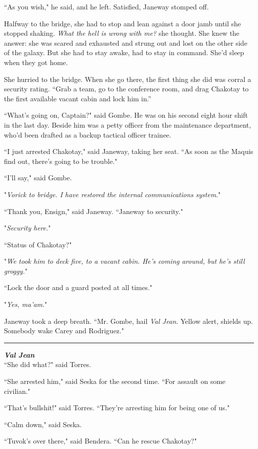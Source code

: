 \documentclass[twoside,letterpaper,12pt]{memoir}
\begin{document}
``As you wish," he said, and he left. Satisfied, Janeway stomped off.

Halfway to the bridge, she had to stop and lean against a door jamb until she stopped shaking. \textit{What the hell is wrong with me?} she thought. She knew the answer: she was scared and exhausted and strung out and lost on the other side of the galaxy. But she had to stay awake, had to stay in command. She'd sleep when they got home.

She hurried to the bridge. When she go there, the first thing she did was corral a security rating. ``Grab a team, go to the conference room, and drag Chakotay to the first available vacant cabin and lock him in.''

``What's going on, Captain?" said Gombe. He was on his second eight hour shift in the last day. Beside him was a petty officer from the maintenance department, who'd been drafted as a backup tactical officer trainee.

``I just arrested Chakotay," said Janeway, taking her seat. ``As soon as the Maquis find out, there's going to be trouble."

``I'll say," said Gombe.

"\textit{Vorick to bridge. I have restored the internal communications system}."

``Thank you, Ensign," said Janeway. ``Janeway to security."

"\textit{Security here.}"

``Status of Chakotay?"

"\textit{We took him to deck five, to a vacant cabin. He’s coming around, but he’s still groggy.}"

``Lock the door and a guard posted at all times."

"\textit{Yes, ma'am.}"

Janeway took a deep breath. ``Mr. Gombe, hail \textit{Val Jean}. Yellow alert, shields up. Somebody wake Carey and Rodriguez."

\fancybreak{\rule{3cm}{0.4 pt}}
\noindent\textit{\textbf{Val Jean}}\\

``She did what?" said Torres.

``She arrested him," said Seska for the second time. ``For assault on some civilian."

``That's bullshit!" said Torres. ``They're arresting him for being one of us."

``Calm down," said Seska.

``Tuvok's over there," said Bendera. ``Can he rescue Chakotay?"
\end{document}
